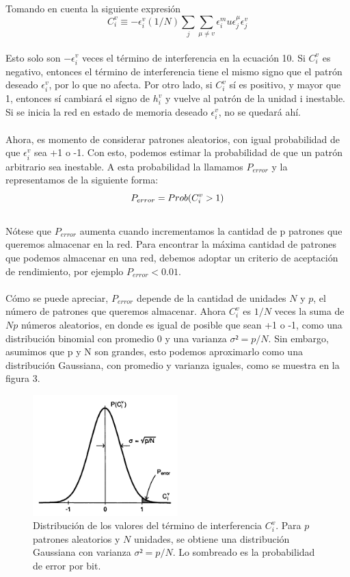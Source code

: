 \documentclass{article}
\begin{document}
Tomando en cuenta la siguiente expresión
\begin{equation}
    C_i^v \equiv  -\epsilon_i^v (1/N)\sum_j\sum_{\mu\neq v}\epsilon_i^mu\epsilon_j^\mu\epsilon_j^v
    \label{eq:condición de estabilidad}
\end{equation}
\\
Esto solo son $-\epsilon_i^v$ veces el término de interferencia en la ecuación 10. Si $C_i^v$ es negativo, entonces el término de interferencia tiene el mismo signo que el patrón deseado $\epsilon_i^v$, por lo que no afecta. Por otro lado, si $C_i^v$ sí es positivo, y mayor que 1, entonces sí cambiará el signo de $h_i^v$ y vuelve al patrón de la unidad i inestable. Si se inicia la red en estado de memoria deseado $\epsilon_i^v$, no se quedará ahí.
\\\\
Ahora, es momento de considerar patrones aleatorios, con igual probabilidad de que $\epsilon_i^v$ sea +1 o -1. Con esto, podemos estimar la probabilidad de que un patrón arbitrario sea inestable. A esta probabilidad la llamamos $P_{error}$ y la representamos de la siguiente forma:
\begin{equation}
    P_{error} =Prob (C_i^v > 1)
    \label{eq:P_{error}}
\end{equation}
\\
Nótese que $P_{error}$ aumenta cuando incrementamos la cantidad de p patrones que queremos almacenar en la red. Para encontrar la máxima cantidad de patrones que podemos almacenar en una red, debemos adoptar un criterio de aceptación de rendimiento, por ejemplo $P_{error} < 0.01$.
\\\\
Cómo se puede apreciar, $P_{error}$ depende de la cantidad de unidades $N$ y $p$, el número de patrones que queremos almacenar. Ahora $C_i^v$ es $1/N$ veces la suma de $Np$ números aleatorios, en donde es igual de posible que sean +1 o -1, como una distribución binomial con promedio 0 y una varianza $\sigma² = p/N$. Sin embargo, asumimos que p y N son grandes, esto podemos aproximarlo como una distribución Gaussiana, con promedio y varianza iguales, como se muestra en la figura 3.

\begin{figure}[h]
\centering
\includegraphics[width=0.5\textwidth]{images/distribusión.png}
\caption{Distribución de los valores del término de interferencia $C_i^v$. Para $p$ patrones aleatorios y $N$ unidades, se obtiene una distribución Gaussiana con varianza $\sigma² = p/N$. Lo sombreado es la probabilidad de error por bit.}
\label{fig:Espacio de soluciones}
\end{figure}
\end{document}
